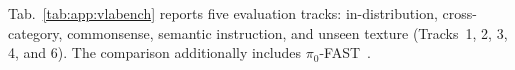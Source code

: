 Tab.~\ref{tab:app:vlabench} reports five evaluation tracks:
in-distribution, cross-category, commonsense, semantic instruction, and
unseen texture (Tracks~1, 2, 3, 4, and 6). The comparison additionally
includes $\pi_0$-FAST~\citep{pertsch2025fast}.

